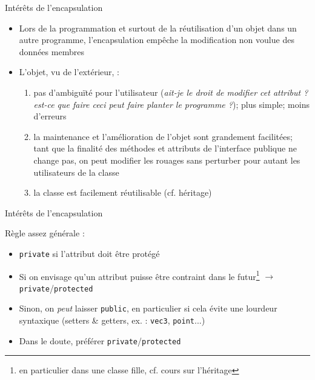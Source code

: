 \documentclass[c]{beamer}
\newcommand{\inline}[1]{\texttt{#1}}
\begin{document}

\begin{frame}[fragile]{Intérêts de l'encapsulation}
\begin{itemize}
\item Lors de la programmation et surtout de la réutilisation d'un objet dans un
autre programme, l'encapsulation empêche la modification non voulue des données
membres

\item L'objet, vu de l'extérieur, \pause :

\begin{enumerate}[<+->]
\item pas d'ambiguïté pour l'utilisateur (\textit{ait-je le droit de modifier cet attribut ?} \textit{est-ce que faire ceci peut faire planter le programme ?}); plus simple; moins d'erreurs
\item la maintenance et l'amélioration de l'objet sont grandement facilitées; tant que la finalité des méthodes et attributs de l'interface publique ne change pas, on peut modifier les rouages sans perturber pour autant les utilisateurs de la classe
\item la classe est facilement réutilisable (cf. héritage)
\end{enumerate}
\end{itemize}
\end{frame}


\begin{frame}[fragile]{Intérêts de l'encapsulation}

Règle assez générale :
\begin{itemize}[<+->]
\item \inline{private} si l'attribut doit être protégé
\item Si on envisage qu'un attribut puisse être contraint dans le futur\footnote{en particulier dans une classe fille, cf. cours sur l'héritage} $\rightarrow$ \inline{private}/\inline{protected}
\item Sinon, on \emph{peut} laisser \inline{public}, en particulier si cela évite une lourdeur syntaxique (setters \& getters, ex. : \texttt{vec3}, \texttt{point}...)
\item Dans le doute, préférer \inline{private}/\inline{protected}
\end{itemize}

\end{frame}
\end{document}

